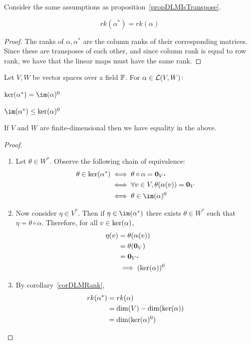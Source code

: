 \documentclass[../Main.tex]{subfiles}
\begin{document}
\begin{corollary}
    Consider the same assumptions as proposition~\ref{propDLMIsTranspose}.

    \begin{equation*}
        rk(\alpha^*) = rk(\alpha)
    \end{equation*}
    \label{corDLMRank}
\end{corollary}
\begin{proof}
    The ranks of $\alpha, \alpha^*$ are the column ranks of their corresponding matrices. Since these are transposes of each other, and since column rank is equal to row rank, we have that the linear maps must have the same rank.
\end{proof}
\begin{propositions}{
        Let $V, W$ be vector spaces over a field $\mathbb{F}$. For $\alpha \in \mathcal{L}(V, W)$:
        \label{propsDLMImKer}
    }
    \item $\ker(\alpha^*) = \im(\alpha)^0$ \label{propDLMKer}
    \item $\im(\alpha^*) \leq \ker(\alpha)^0$ \label{propDLMIm}
    \item If $V$ and $W$ are finite-dimensional then we have equality in the above. \label{propDLMFinteIm}
\end{propositions}
\begin{proof}
    \begin{enumerate}
        \item Let $\theta \in W^*$. Observe the following chain of equivalence:
            \begin{align*}
                \theta \in \ker(\alpha^*) &\iff \theta \circ \alpha = \zv_{V^*} \\
                &\iff \forall v \in V, \theta(\alpha(v)) = \zv_V \\
                &\iff \theta \in \im(\alpha)^0
            \end{align*}
        \item Now consider $\eta \in V^*$. Then if $\eta \in \im(\alpha^*)$ there exists $\theta \in W^*$ such that $\eta = \theta \circ \alpha$. Therefore, for all $v \in \ker(\alpha)$,
            \begin{align*}
                \eta(v) &= \theta(\alpha(v)) \\
                &= \theta(\boldsymbol{0}_V) \\
                &= \boldsymbol{0}_{V^*} \\
                &\implies (\ker(\alpha))^0
            \end{align*}
        \item By corollary~\ref{corDLMRank},
            \begin{align*}
                rk(\alpha^*) &= rk(\alpha) \\
                &= \dim(V) - \dim(\ker(\alpha)) \\
                &= \dim(\ker(\alpha)^0)
            \end{align*}
    \end{enumerate}
\end{proof}
\end{document}
